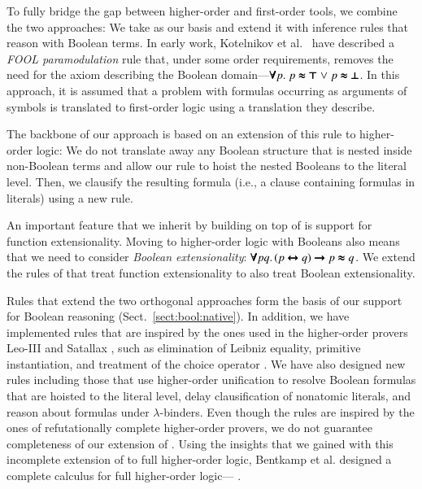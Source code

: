 To fully bridge the gap between higher-order and first-order tools,
we combine the two approaches: We take \lsup{} as our basis and  extend it with inference rules that reason with
Boolean terms. In early work, Kotelnikov et al.\ 
\cite{kotelnikov-15-fool} have described a \emph{FOOL paramodulation}
rule that, under some order requirements, removes the need for the axiom
describing the Boolean domain---$\pmb{\forall} p. \; p \pmb{\approx} \pmb{\top} \mathrel\lor p
\pmb{\approx} \pmb{\bot}$. In this approach, it is assumed that a problem with formulas occurring as
arguments of symbols is translated to first-order logic using a translation they describe. 

The backbone of our approach is based on an extension of this rule to higher-order
logic: We do not translate away any Boolean structure that is nested inside
non-Boolean terms and allow our rule to hoist the nested Booleans to the
literal level. Then, we clausify the resulting formula (i.e., a clause containing formulas in literals) using a new rule.


 An important feature that we inherit by building on top of \lsup{}
is support for function extensionality. Moving to higher-order logic with
Booleans also means that we need to consider \emph{Boolean extensionality}:
$\pmb{\forall} pq. \, (p \pmb{\leftrightarrow} q) \pmb{\rightarrow} p \pmb{\approx} q$. We extend the rules of
\lsup{} that treat function extensionality to also treat Boolean
extensionality.

Rules that extend the two orthogonal approaches form the basis of our support
for Boolean reasoning (Sect.~\ref{sect:bool:native}). In addition, we have
implemented rules that are inspired by the ones used in the higher-order provers
Leo-III \cite{sb-21-leo3} and Satallax \cite{cb-12-satallax}, such as
elimination of Leibniz equality, primitive instantiation, and treatment of the choice
operator \cite{pa-01-classical-ty-thy}. We have also designed new rules including those that use
higher-order unification to resolve Boolean formulas that are hoisted to the literal
level, delay clausification of nonatomic literals, and reason about formulas under
$\lambda$-binders. Even though the rules are inspired by
the ones of refutationally complete higher-order provers, we do not guarantee
completeness of our extension of \lsup{}. Using the insights that we gained with
this incomplete extension of \lsup{} to full higher-order logic, Bentkamp et al.
designed a complete calculus for full higher-order logic---\osup{}
\cite{bbtv-21-full-ho-sup}.


